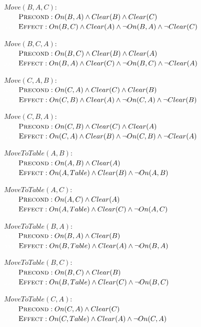 \documentclass{article}
\begin{document}
\begin{enumerate}
$Move(B,A,C):$ \\
\textcolor{white}{aaaa}$\textsc{Precond}:On(B,A) \land Clear(B) \land Clear(C)$ \\
\textcolor{white}{aaaa}$\textsc{Effect}:On(B,C) \land Clear(A) \land \neg On(B,A) \land \neg Clear(C)$

$Move(B,C,A):$ \\
\textcolor{white}{aaaa}$\textsc{Precond}:On(B,C) \land Clear(B) \land Clear(A)$ \\
\textcolor{white}{aaaa}$\textsc{Effect}:On(B,A) \land Clear(C) \land \neg On(B,C) \land \neg Clear(A)$

$Move(C,A,B):$ \\
\textcolor{white}{aaaa}$\textsc{Precond}:On(C,A) \land Clear(C) \land Clear(B)$ \\
\textcolor{white}{aaaa}$\textsc{Effect}:On(C,B) \land Clear(A) \land \neg On(C,A) \land \neg Clear(B)$

$Move(C,B,A):$ \\
\textcolor{white}{aaaa}$\textsc{Precond}:On(C,B) \land Clear(C) \land Clear(A)$ \\
\textcolor{white}{aaaa}$\textsc{Effect}:On(C,A) \land Clear(B) \land \neg On(C,B) \land \neg Clear(A)$

$MoveToTable(A,B):$ \\
\textcolor{white}{aaaa}$\textsc{Precond}:On(A,B) \land Clear(A)$ \\
\textcolor{white}{aaaa}$\textsc{Effect}:On(A,Table) \land Clear(B) \land \neg On(A,B)$

$MoveToTable(A,C):$ \\
\textcolor{white}{aaaa}$\textsc{Precond}:On(A,C) \land Clear(A)$ \\
\textcolor{white}{aaaa}$\textsc{Effect}:On(A,Table) \land Clear(C) \land \neg On(A,C)$

$MoveToTable(B,A):$ \\
\textcolor{white}{aaaa}$\textsc{Precond}:On(B,A) \land Clear(B)$ \\
\textcolor{white}{aaaa}$\textsc{Effect}:On(B,Table) \land Clear(A) \land \neg On(B,A)$

$MoveToTable(B,C):$ \\
\textcolor{white}{aaaa}$\textsc{Precond}:On(B,C) \land Clear(B)$ \\
\textcolor{white}{aaaa}$\textsc{Effect}:On(B,Table) \land Clear(C) \land \neg On(B,C)$

$MoveToTable(C,A):$ \\
\textcolor{white}{aaaa}$\textsc{Precond}:On(C,A) \land Clear(C)$ \\
\textcolor{white}{aaaa}$\textsc{Effect}:On(C,Table) \land Clear(A) \land \neg On(C,A)$


\end{enumerate}
\end{document}
